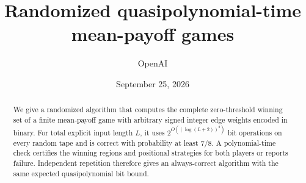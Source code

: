 \documentclass[11pt]{article}
\title{Randomized quasipolynomial-time mean-payoff games}
\author{OpenAI}
\date{September 25, 2026}
\begin{document}
\maketitle
\begin{abstract}
We give a randomized algorithm that computes the complete zero-threshold
winning set of a finite mean-payoff game with arbitrary signed integer edge
weights encoded in binary. For total explicit input length $L$, it uses
$2^{O((\log(L+2))^2)}$ bit operations on every random tape and is correct
with probability at least $7/8$. A polynomial-time check certifies the winning
regions and positional strategies for both players or reports failure.
Independent repetition therefore gives an always-correct algorithm with the
same expected quasipolynomial bit bound.
\end{abstract}
\setcounter{tocdepth}{1}
\hypersetup{bookmarksdepth=2}
\tableofcontents
\clearpage







\clearpage

\appendix



\end{document}
